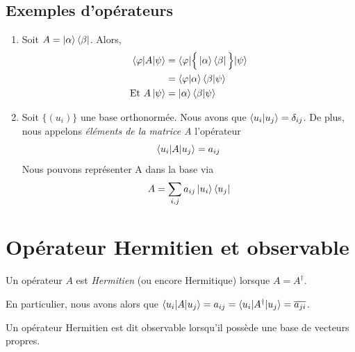 \documentclass[../notesdecours.tex]{subfiles}
\begin{document}
\subsection{Exemples d'opérateurs}
\begin{enumerate}
\item Soit $A=\ket{\alpha}\bra{\beta}$. Alors,
\begin{align}
\braket{\varphi|A|\psi} &= \braket{\varphi|\Big\{\ket{\alpha}\bra{\beta}\Big\}|\psi}\\
&= \braket{\varphi|\alpha}\braket{\beta|\psi}\\
\text{Et } A\ket{\psi} &= \ket{\alpha}\braket{\beta|\psi}
\end{align}
\item Soit $\Big\{(u_i)\Big\}$ une base orthonormée. Nous avons que $\braket{u_i|u_j} = \delta_{ij}$. De plus, nous appelons \emph{éléments de la matrice A} l'opérateur
\begin{equation}
\braket{u_i|A|u_j} = a_{ij}
\end{equation}
Nous pouvons représenter A dans la base via
\begin{equation}
A = \sum_{i,j} a_{ij} \ket{u_i}\bra{u_j}
\end{equation}
\end{enumerate}

\section{Opérateur Hermitien et observable}
\begin{definition}
Un opérateur $A$ est \emph{Hermitien} (ou encore Hermitique) lorsque $A = A^\dag$.
\end{definition}
\begin{Property}
En particulier, nous avons alors que $\braket{u_i|A|u_j} = a_{ij} = \braket{u_i|A^\dag|u_j} = \overline{a_{ji}}$.
\end{Property}
\begin{definition}
Un opérateur Hermitien est dit observable lorsqu'il possède une base de vecteurs propres.
\end{definition}
\end{document}
